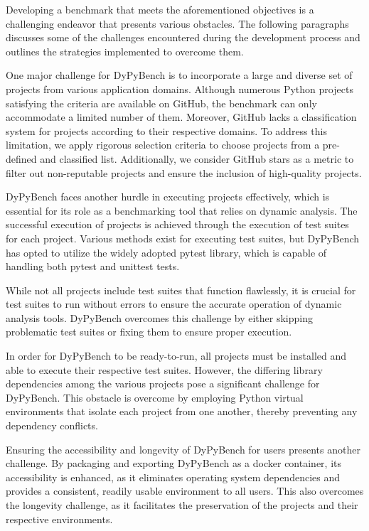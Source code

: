 Developing a benchmark that meets the aforementioned objectives is a challenging endeavor that presents various obstacles. The following paragraphs discusses some of the challenges encountered during the development process and outlines the strategies implemented to overcome them.

One major challenge for DyPyBench is to incorporate a large and diverse set of projects from various application domains.
Although numerous Python projects satisfying the criteria are available on GitHub, the benchmark can only accommodate a limited number of them.
Moreover, GitHub lacks a classification system for projects according to their respective domains.
To address this limitation, we apply rigorous selection criteria to choose projects from a pre-defined and classified list.
Additionally, we consider GitHub stars as a metric to filter out non-reputable projects and ensure the inclusion of high-quality projects.

DyPyBench faces another hurdle in executing projects effectively, which is essential for its role as a benchmarking tool that relies on dynamic analysis.
The successful execution of projects is achieved through the execution of test suites for each project.
Various methods exist for executing test suites, but DyPyBench has opted to utilize the widely adopted pytest library, which is capable of handling both pytest and unittest tests.

While not all projects include test suites that function flawlessly, it is crucial for test suites to run without errors to ensure the accurate operation of dynamic analysis tools.
DyPyBench overcomes this challenge by either skipping problematic test suites or fixing them to ensure proper execution.

In order for DyPyBench to be ready-to-run, all projects must be installed and able to execute their respective test suites.
However, the differing library dependencies among the various projects pose a significant challenge for DyPyBench.
This obstacle is overcome by employing Python virtual environments that isolate each project from one another, thereby preventing any dependency conflicts.

Ensuring the accessibility and longevity of DyPyBench for users presents another challenge.
By packaging and exporting DyPyBench as a docker container, its accessibility is enhanced, as it eliminates operating system dependencies and provides a consistent, readily usable environment to all users.
This also overcomes the longevity challenge, as it facilitates the preservation of the projects and their respective environments.


